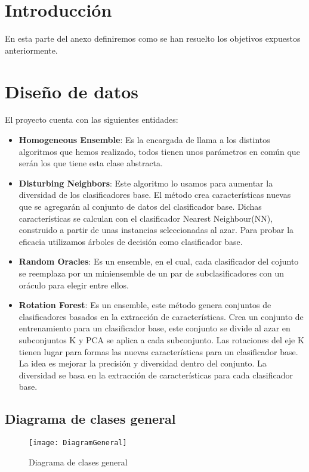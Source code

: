 
\section{Introducción}
En esta parte del anexo definiremos como se han resuelto los objetivos expuestos anteriormente.
\section{Diseño de datos}
El proyecto cuenta con las siguientes entidades:
\begin{itemize}
	\item \textbf{Homogeneous Ensemble}: Es la encargada de llama a los distintos algoritmos que hemos realizado, todos tienen unos parámetros en común que serán los que tiene esta clase abstracta.
	\item \textbf{Disturbing Neighbors}: Este algoritmo lo usamos para aumentar la diversidad de los clasificadores base. El método crea características nuevas que se agregarán al conjunto de datos del clasificador base. Dichas características se calculan con el clasificador Nearest Neighbour(NN), construido a partir de unas instancias seleccionadas al azar. Para probar la eficacia utilizamos árboles de decisión como clasificador base.
	\item \textbf{Random Oracles}: Es un ensemble, en el cual, cada clasificador del cojunto se reemplaza por un miniensemble de un par de subclasificadores con un oráculo para elegir entre ellos.
	\item \textbf{Rotation Forest}: Es un ensemble, este método genera conjuntos de clasificadores basados en la extracción de características. Crea un conjunto de entrenamiento para un clasificador base, este conjunto se divide al azar en subconjuntos K y PCA se aplica a cada subconjunto. Las rotaciones del eje K tienen lugar para formas las nuevas características para un clasificador base. La idea es mejorar la precisión y diversidad dentro del conjunto. La diversidad se basa en la extracción de características para cada clasificador base.
\end{itemize}


\subsection{Diagrama de clases general}\label{diagram-general}
\begin{figure}
\centering
\texttt{[image: DiagramGeneral]}
\caption{Diagrama de clases general}
\label{fig:DiagramGeneral}
\end{figure}

